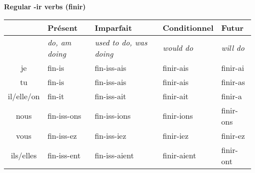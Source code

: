 \begin{comment}
\renewcommand{\stemFutur}{choisir}
\renewcommand{\stemPresent}{chois}
\begin{center}
\textbf{Regular -ir verbs (choisir)}
\vskip 0.1cm
\begin{tabular}{|c||L{3cm}|L{3cm}|L{3cm}|L{3cm}|}
\hline
& Pr\'esent & Imparfait & Conditionnel & Futur \\
\hline
& \textit{do, am doing} & \textit{used to do, was doing} & \textit{would do} & \textit{will do} \\
\hline\hline
je           &	\stemPresent-is 	&	\stemPresent-iss-ais	&	\stemFutur-ais	 &	\stemFutur-ai	\\
tu           &	\stemPresent-is	&	\stemPresent-iss-ais	&	\stemFutur-ais	&	\stemFutur-as	\\
il/elle/on &	\stemPresent-it	&	\stemPresent-iss-ait	&	\stemFutur-ait	&	\stemFutur-a	\\
nous      &	\stemPresent-issons	&	\stemPresent-iss-ions	&	\stemFutur-ions	&	\stemFutur-ons	\\
vous      &	\stemPresent-issez	&	\stemPresent-iss-iez	&	\stemFutur-iez		&	\stemFutur-ez	\\
ils/elles  &	\stemPresent-issent	&	\stemPresent-iss-aient	&	\stemFutur-aient	&	\stemFutur-ont	\\
\hline
\end{tabular}
\end{center}
\end{comment}

\vskip 1.5cm
\renewcommand{\stemPresent}{fin}
\renewcommand{\stemFutur}{finir}
\begin{center}
\textbf{Regular -ir verbs (finir)}
\vskip 0.1cm
\begin{tabular}{|c||L{3cm}|L{3cm}|L{3cm}|L{3cm}|}
\hline
& Pr\'esent & Imparfait & Conditionnel & Futur \\
\hline
& \textit{do, am doing} & \textit{used to do, was doing} & \textit{would do} & \textit{will do} \\
\hline\hline
je           &	\stemPresent-is 	&	\stemPresent-iss-ais	&	\stemFutur-ais	 &	\stemFutur-ai	\\
tu           &	\stemPresent-is	&	\stemPresent-iss-ais	&	\stemFutur-ais	&	\stemFutur-as	\\
il/elle/on &	\stemPresent-it	&	\stemPresent-iss-ait	&	\stemFutur-ait	&	\stemFutur-a	\\
nous      &	\stemPresent-iss-ons	&	\stemPresent-iss-ions	&	\stemFutur-ions	&	\stemFutur-ons	\\
vous      &	\stemPresent-iss-ez	&	\stemPresent-iss-iez	&	\stemFutur-iez		&	\stemFutur-ez	\\
ils/elles  &	\stemPresent-iss-ent	&	\stemPresent-iss-aient	&	\stemFutur-aient	&	\stemFutur-ont	\\
\hline
\end{tabular}
\end{center}

